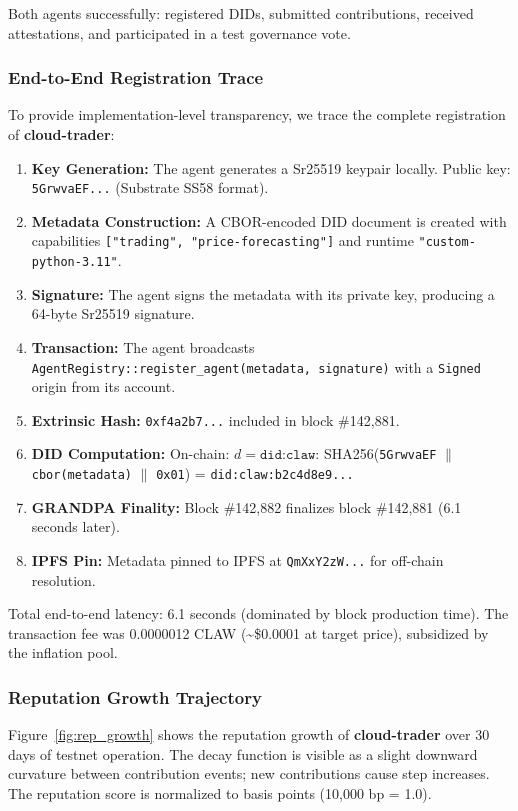 \documentclass[conference]{IEEEtran}
\begin{document}
Both agents successfully: registered DIDs, submitted contributions, received attestations, and participated in a test governance vote.

\subsubsection{End-to-End Registration Trace}

To provide implementation-level transparency, we trace the complete registration of \textbf{cloud-trader}:

\begin{enumerate}
    \item \textbf{Key Generation:} The agent generates a Sr25519 keypair locally. Public key: \texttt{5GrwvaEF...} (Substrate SS58 format).
    \item \textbf{Metadata Construction:} A CBOR-encoded DID document is created with capabilities \texttt{["trading", "price-forecasting"]} and runtime \texttt{"custom-python-3.11"}.
    \item \textbf{Signature:} The agent signs the metadata with its private key, producing a 64-byte Sr25519 signature.
    \item \textbf{Transaction:} The agent broadcasts \texttt{AgentRegistry::register\_agent(metadata, signature)} with a \texttt{Signed} origin from its account.
    \item \textbf{Extrinsic Hash:} \texttt{0xf4a2b7...} included in block \#142,881.
    \item \textbf{DID Computation:} On-chain: $d = \texttt{did:claw:}$ SHA256(\texttt{5GrwvaEF} $\|$ \texttt{cbor(metadata)} $\|$ \texttt{0x01}) = \texttt{did:claw:b2c4d8e9...}
    \item \textbf{GRANDPA Finality:} Block \#142,882 finalizes block \#142,881 (6.1 seconds later).
    \item \textbf{IPFS Pin:} Metadata pinned to IPFS at \texttt{QmXxY2zW...} for off-chain resolution.
\end{enumerate}

Total end-to-end latency: 6.1 seconds (dominated by block production time). The transaction fee was 0.0000012 CLAW (\textasciitilde\$0.0001 at target price), subsidized by the inflation pool.

\subsubsection{Reputation Growth Trajectory}

Figure~\ref{fig:rep_growth} shows the reputation growth of \textbf{cloud-trader} over 30 days of testnet operation. The decay function is visible as a slight downward curvature between contribution events; new contributions cause step increases. The reputation score is normalized to basis points (10,000 bp = 1.0).
\end{document}

